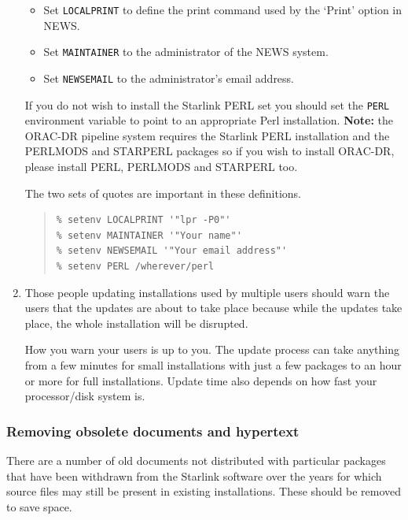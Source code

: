 \documentclass[twoside,11pt]{article}
\renewcommand{\_}{\texttt{\symbol{95}}}
\begin{document}
\begin{enumerate}
\begin{itemize}
\item Set \texttt{LOCALPRINT} to define the print command used by the
`Print' option in NEWS.
\item Set \texttt{MAINTAINER} to the administrator of the NEWS system.
\item Set \texttt{NEWSEMAIL} to the administrator's email address.
\end{itemize}

If you do not wish to install the Starlink PERL set you should set the
\texttt{PERL} environment variable to point to an appropriate Perl
installation.   \textbf{Note:} the ORAC-DR pipeline system requires the
Starlink PERL installation and the PERLMODS and STARPERL packages so if
you wish to install ORAC-DR, please install PERL, PERLMODS and STARPERL too.

The two sets of quotes are important in these definitions.

\begin{quote}
\begin{verbatim}
% setenv LOCALPRINT '"lpr -P0"'
% setenv MAINTAINER '"Your name"'
% setenv NEWSEMAIL '"Your email address"'
% setenv PERL /wherever/perl
\end{verbatim}
\end{quote}

\item Those people updating installations used by multiple users should warn
the users that the updates are about to take place because while the updates
take place, the whole installation will be disrupted.

How you warn your users is up to you.  The update process can take
anything from a few minutes for small installations with just a few
packages to an hour or more for full installations.  Update time also
depends on how fast your processor/disk system is.

\end{enumerate}

\subsubsection{Removing obsolete documents and hypertext}

There are a number of old documents not distributed with particular
packages that have been withdrawn from the Starlink software over the
years for which source files may still be present in existing installations.
These should be removed to save space.
\end{document}

